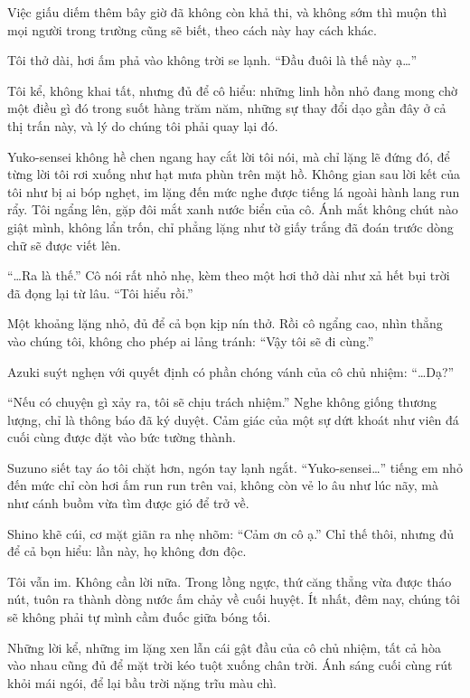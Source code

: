 \documentclass[../main.tex]{subfiles}
\begin{document}
Việc giấu diếm thêm bây giờ đã không còn khả thi, và không sớm thì muộn thì mọi người trong trường cũng sẽ biết, theo cách này hay cách khác.

Tôi thở dài, hơi ấm phả vào không trời se lạnh. ``Đầu đuôi là thế này ạ\dots''

Tôi kể, không khai tất, nhưng đủ để cô hiểu: những linh hồn nhỏ đang mong chờ một điều gì đó trong suốt hàng trăm năm, những sự thay đổi dạo gần đây ở cả thị trấn này, và lý do chúng tôi phải quay lại đó.

Yuko-sensei không hề chen ngang hay cắt lời tôi nói, mà chỉ lặng lẽ đứng đó, để từng lời tôi rơi xuống như hạt mưa phùn trên mặt hồ. Không gian sau lời kết của tôi như bị ai bóp nghẹt, im lặng đến mức nghe được tiếng lá ngoài hành lang run rẩy. Tôi ngẩng lên, gặp đôi mắt xanh nước biển của cô. Ánh mắt không chút nào giật mình, không lẩn trốn, chỉ phẳng lặng như tờ giấy trắng đã đoán trước dòng chữ sẽ được viết lên.

``\dots Ra là thế.'' Cô nói rất nhỏ nhẹ, kèm theo một hơi thở dài như xả hết bụi trời đã đọng lại từ lâu. ``Tôi hiểu rồi.''

Một khoảng lặng nhỏ, đủ để cả bọn kịp nín thở. Rồi cô ngẩng cao, nhìn thẳng vào chúng tôi, không cho phép ai lảng tránh: ``Vậy tôi sẽ đi cùng.''

Azuki suýt nghẹn với quyết định có phần chóng vánh của cô chủ nhiệm: ``\dots Dạ?''

``Nếu có chuyện gì xảy ra, tôi sẽ chịu trách nhiệm.'' Nghe không giống thương lượng, chỉ là thông báo đã ký duyệt. Cảm giác của một sự dứt khoát như viên đá cuối cùng được đặt vào bức tường thành.

Suzuno siết tay áo tôi chặt hơn, ngón tay lạnh ngắt. ``Yuko-sensei\dots'' tiếng em nhỏ đến mức chỉ còn hơi ấm run run trên vai, không còn vẻ lo âu như lúc nãy, mà như cánh buồm vừa tìm được gió để trở về.

Shino khẽ cúi, cơ mặt giãn ra nhẹ nhõm: ``Cảm ơn cô ạ.'' Chỉ thế thôi, nhưng đủ để cả bọn hiểu: lần này, họ không đơn độc.

Tôi vẫn im. Không cần lời nữa. Trong lồng ngực, thứ căng thẳng vừa được tháo nút, tuôn ra thành dòng nước ấm chảy về cuối huyệt. Ít nhất, đêm nay, chúng tôi sẽ không phải tự mình cầm đuốc giữa bóng tối.

\ct

Những lời kể, những im lặng xen lẫn cái gật đầu của cô chủ nhiệm, tất cả hòa vào nhau cũng đủ để mặt trời kéo tuột xuống chân trời. Ánh sáng cuối cùng rút khỏi mái ngói, để lại bầu trời nặng trĩu màu chì.
\end{document}
